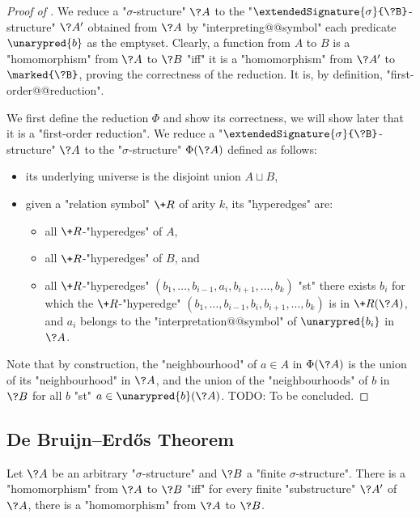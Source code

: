 \begin{proof}[Proof of ]
We reduce a "$\sigma$-structure" $\?A$ to the
"$\extendedSignature{\sigma}{\?B}$-structure" $\?A'$ obtained
from $\?A$ by "interpreting@@symbol" each predicate $\unarypred{b}$ as the emptyset.
Clearly, a function from $A$ to $B$ is a "homomorphism" from $\?A$ to $\?B$
"iff" it is a "homomorphism" from $\?A'$ to $\marked{\?B}$, proving the correctness
of the reduction. It is, by definition, "first-order@@reduction".

We first define the reduction $\Phi$ and show its correctness, we will show later that it
is a "first-order reduction". We reduce a "$\extendedSignature{\sigma}{\?B}$-structure" $\?A$ to the "$\sigma$-structure"
$\Phi(\?A)$ defined as follows:
\begin{itemize}
	\item its underlying universe is the disjoint union $A \sqcup B$,
	\item given a "relation symbol" $\+R$ of arity $k$, its "hyperedges" are:
	\begin{itemize}
	\item all $\+R$-"hyperedges" of $A$,
	\item all $\+R$-"hyperedges" of $B$, and
	\item all $\+R$-"hyperedges" $(b_1,\hdots,b_{i-1}, a_i, b_{i+1},\hdots,b_k)$
		"st" there exists $b_i$ for which the $\+R$-"hyperedge"
		$(b_1,\hdots,b_{i-1}, b_i, b_{i+1},\hdots,b_k)$
		is in $\+R(\?A)$, and $a_i$ belongs to the "interpretation@@symbol" of 
		$\unarypred{b_i}$ in $\?A$.
	\end{itemize}
\end{itemize}
Note that by construction, the "neighbourhood" of $a \in A$ in $\Phi(\?A)$ is
the union of its "neighbourhood" in $\?A$, and the union of the "neighbourhoods" of
$b$ in $\?B$ for all $b$ "st" $a \in \unarypred{b}(\?A)$.
TODO: To be concluded.  
\end{proof}

\subsection{De Bruijn–Erdős Theorem}

\begin{proposition}
	\label{prop:de-bruijn-erdos}
	Let $\?A$ be an arbitrary "$\sigma$-structure" and $\?B$ a "finite $\sigma$-structure".
	There is a "homomorphism" from $\?A$ to $\?B$ "iff" for every finite "substructure" $\?A'$
	of $\?A$, there is a "homomorphism" from $\?A$ to $\?B$.
\end{proposition}

